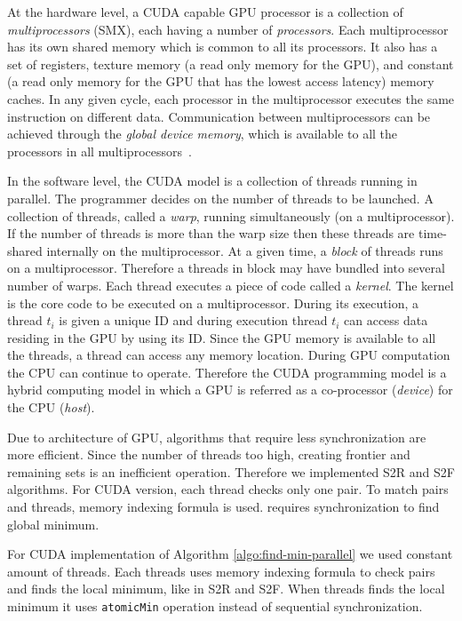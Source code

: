 \documentclass[12pt]{article}
\begin{document}
At the hardware level, a CUDA capable GPU processor is a collection of
\textit{multiprocessors} (SMX), each having a number of
\textit{processors}.  Each multiprocessor has its own shared memory
which is common to all its processors.  It also has a set of
registers, texture memory (a read only memory for the GPU), and
constant (a read only memory for the GPU that has the lowest access
latency) memory caches.  In any given cycle, each processor in the
multiprocessor executes the same instruction on different data.
Communication between multiprocessors can be achieved through the
\textit{global device memory}, which is available to all the
processors in all multiprocessors~\cite{nvidia}.

In the software level, the CUDA model is a collection of threads
running in parallel.  The programmer decides on the number of threads
to be launched.  A collection of threads, called a \textit{warp},
running simultaneously (on a multiprocessor).  If the number of
threads is more than the warp size then these threads are time-shared
internally on the multiprocessor.  At a given time, a \textit{block}
of threads runs on a multiprocessor.  Therefore a threads in block may
have bundled into several number of warps.  Each thread executes a
piece of code called a \textit{kernel}.  The kernel is the core code
to be executed on a multiprocessor.  During its execution, a thread
$t_i$ is given a unique ID and during execution thread $t_i$ can
access data residing in the GPU by using its ID.  Since the GPU memory
is available to all the threads, a thread can access any memory
location.  During GPU computation the CPU can continue to operate.
Therefore the CUDA programming model is a hybrid computing model in
which a GPU is referred as a co-processor (\textit{device}) for the
CPU (\textit{host}).

Due to architecture of GPU, algorithms that require less synchronization are more efficient. Since the number of threads too high, creating frontier and remaining sets is an inefficient operation. Therefore we implemented S2R and S2F algorithms. For CUDA version, each thread checks only one pair. To match pairs and threads, memory indexing formula is used.  requires synchronization to find global minimum. 

For CUDA implementation of Algorithm \ref{algo:find-min-parallel} we used constant amount of threads. Each threads uses memory indexing formula to check pairs and finds the local minimum, like in S2R and S2F. When threads finds the local minimum it uses {\tt atomicMin} operation instead of sequential synchronization.
\end{document}
